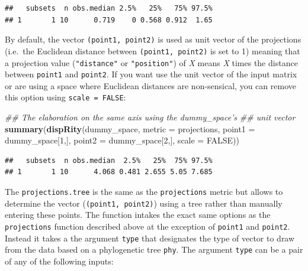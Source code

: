 \documentclass[]{book}
\newenvironment{Shaded}{\begin{snugshade}}{\end{snugshade}}
\newcommand{\CommentTok}[1]{\textcolor[rgb]{0.56,0.35,0.01}{\textit{#1}}}
\newcommand{\DataTypeTok}[1]{\textcolor[rgb]{0.13,0.29,0.53}{#1}}
\newcommand{\DecValTok}[1]{\textcolor[rgb]{0.00,0.00,0.81}{#1}}
\newcommand{\KeywordTok}[1]{\textcolor[rgb]{0.13,0.29,0.53}{\textbf{#1}}}
\newcommand{\NormalTok}[1]{#1}
\newcommand{\OtherTok}[1]{\textcolor[rgb]{0.56,0.35,0.01}{#1}}
\begin{document}
\begin{verbatim}
##   subsets  n obs.median 2.5%   25%   75% 97.5%
## 1       1 10      0.719    0 0.568 0.912  1.65
\end{verbatim}

By default, the vector \texttt{(point1,\ point2)} is used as unit vector of the projections (i.e.~the Euclidean distance between \texttt{(point1,\ point2)} is set to 1) meaning that a projection value (\texttt{"distance"} or \texttt{"position"}) of \emph{X} means \emph{X} times the distance between \texttt{point1} and \texttt{point2}.
If you want use the unit vector of the input matrix or are using a space where Euclidean distances are non-sensical, you can remove this option using \texttt{scale\ =\ FALSE}:

\begin{Shaded}
\begin{Highlighting}[]
\CommentTok{## The elaboration on the same axis using the dummy_space's}
\CommentTok{## unit vector}
\KeywordTok{summary}\NormalTok{(}\KeywordTok{dispRity}\NormalTok{(dummy_space, }\DataTypeTok{metric =}\NormalTok{ projections,}
                              \DataTypeTok{point1 =}\NormalTok{ dummy_space[}\DecValTok{1}\NormalTok{,],}
                              \DataTypeTok{point2 =}\NormalTok{ dummy_space[}\DecValTok{2}\NormalTok{,],}
                              \DataTypeTok{scale =} \OtherTok{FALSE}\NormalTok{))}
\end{Highlighting}
\end{Shaded}

\begin{verbatim}
##   subsets  n obs.median  2.5%   25%  75% 97.5%
## 1       1 10      4.068 0.481 2.655 5.05 7.685
\end{verbatim}

The \texttt{projections.tree} is the same as the \texttt{projections} metric but allows to determine the vector (\texttt{(point1,\ point2)}) using a tree rather than manually entering these points.
The function intakes the exact same options as the \texttt{projections} function described above at the exception of \texttt{point1} and \texttt{point2}.
Instead it takes a the argument \texttt{type} that designates the type of vector to draw from the data based on a phylogenetic tree \texttt{phy}.
The argument \texttt{type} can be a pair of any of the following inputs:
\end{document}
